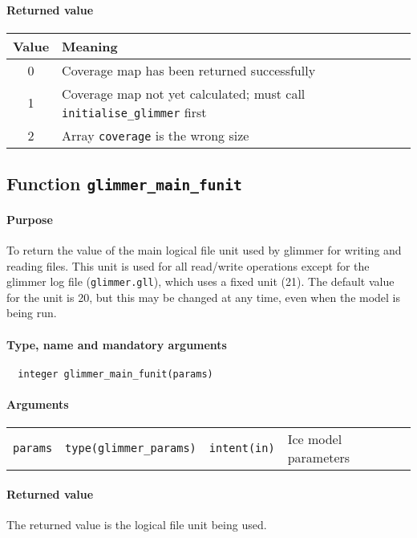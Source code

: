 \paragraph{Returned value}
%
\begin{center}
\begin{tabular}{|c|l|}
\hline
Value & Meaning \\
\hline
\hline
0 & Coverage map has been returned successfully \\
1 & Coverage map not yet calculated; must call \texttt{initialise\_glimmer}
first \\
2 & Array \texttt{coverage} is the wrong size \\
\hline
\end{tabular}
\end{center}
%
\subsection{Function \texttt{glimmer\_main\_funit}}
%
\paragraph{Purpose}
%
To return the value of the main logical file unit used by glimmer for writing
and reading files. This unit is used for all read/write operations except for
the glimmer log file (\texttt{glimmer.gll}), which uses a fixed unit (21). The
default value for the unit is 20, but this may be changed at any time, even
when the model is being run.
%
\paragraph{Type, name and mandatory arguments}
%
\begin{verbatim}
  integer glimmer_main_funit(params)
\end{verbatim}
%
\paragraph{Arguments}
%
\begin{center}
\begin{tabular}{llll}
\texttt{params} & \texttt{type(glimmer\_params)} & \texttt{intent(in)} & Ice model parameters \\
\end{tabular}
\end{center}
%
\paragraph{Returned value}
%
The returned value is the logical file unit being used.
%
